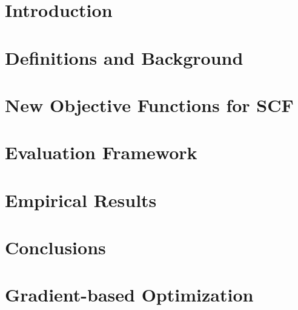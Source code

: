 \documentclass{sig-alternate}
\begin{document}

\section{Introduction}
\label{sec:Introduction}


\section{Definitions and Background}
\label{sec:Background}


\section{New Objective Functions for SCF}
\label{sec:NewObjFuns}


\section{Evaluation Framework}
\label{sec:Evaluation}


\section{Empirical Results}
\label{sec:EmpResults}


\section{Conclusions}
\label{sec:Conclusions}


%



\appendix
\section{Gradient-based Optimization}
\label{app:Derivatives}

\end{document}
